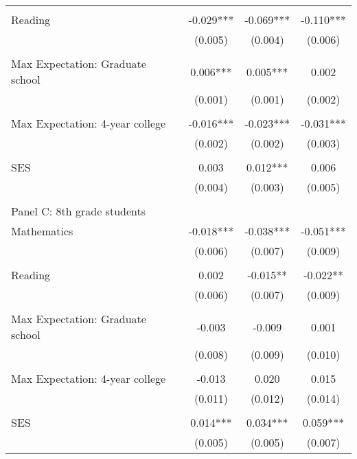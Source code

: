 {\begin{tabular}{lccc}
&  &  &   \\
Reading             &      -0.029***&      -0.069***&      -0.110***\\
                    &     (0.005)   &     (0.004)   &     (0.006)   \\
 
&  &  &   \\
Max Expectation: Graduate school&       0.006***&       0.005***&       0.002   \\
                    &     (0.001)   &     (0.001)   &     (0.002)   \\
 
&  &  &   \\
Max Expectation: 4-year college&      -0.016***&      -0.023***&      -0.031***\\
                    &     (0.002)   &     (0.002)   &     (0.003)   \\
 
&  &  &   \\
SES                 &       0.003   &       0.012***&       0.006   \\
                    &     (0.004)   &     (0.003)   &     (0.005)   \\
 
&  &  &   \\
\multicolumn{4}{l}{Panel C: 8th grade students } \\
Mathematics         &      -0.018***&      -0.038***&      -0.051***\\
                    &     (0.006)   &     (0.007)   &     (0.009)   \\
 
&  &  &   \\
Reading             &       0.002   &      -0.015** &      -0.022** \\
                    &     (0.006)   &     (0.007)   &     (0.009)   \\
 
&  &  &   \\
Max Expectation: Graduate school&      -0.003   &      -0.009   &       0.001   \\
                    &     (0.008)   &     (0.009)   &     (0.010)   \\
 
&  &  &   \\
Max Expectation: 4-year college&      -0.013   &       0.020   &       0.015   \\
                    &     (0.011)   &     (0.012)   &     (0.014)   \\
 
&  &  &   \\
SES                 &       0.014***&       0.034***&       0.059***\\
                    &     (0.005)   &     (0.005)   &     (0.007)   \\
 

\bottomrule
\end{tabular}
}
